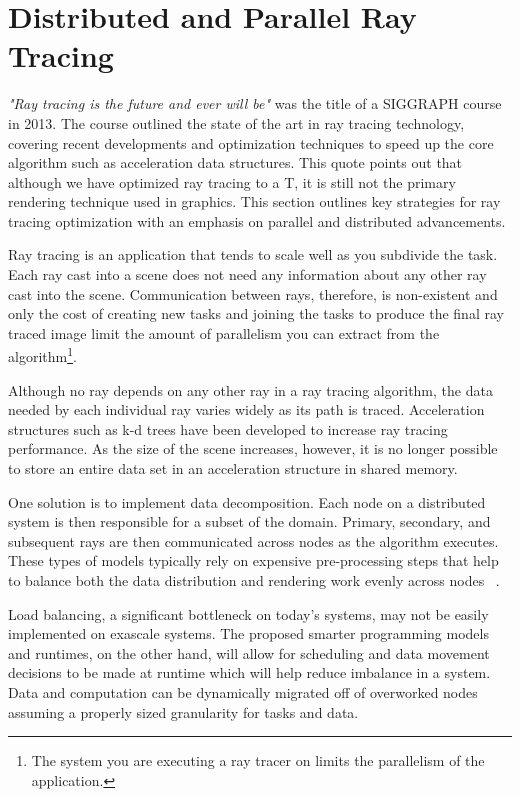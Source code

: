 \section{Distributed and Parallel Ray Tracing}
\label{sec:ray_tracing}

\emph{"Ray tracing is the future and ever will be"} was the title of a SIGGRAPH 
course in 2013.  The course outlined the state of the art in ray tracing 
technology, covering recent developments and optimization techniques to speed up 
the core algorithm such as acceleration data structures.  This quote points out 
that although we have optimized ray tracing to a T, it is still not the primary
rendering technique used in graphics.  This section outlines key strategies for 
ray tracing optimization with an emphasis on parallel and distributed 
advancements.

Ray tracing is an application that tends to scale well as you subdivide the 
task.  Each ray cast into a scene does not need any information about any other 
ray cast into the scene.  Communication between rays, therefore, is non-existent 
and only the cost of creating new tasks and joining the tasks to produce the 
final ray traced image limit the amount of parallelism you can extract from the
algorithm\footnote{ %
  The system you are executing a ray tracer on limits the parallelism of the 
  application.  
}.

Although no ray depends on any other ray in a ray tracing algorithm, the data 
needed by each individual ray varies widely as its path is traced. Acceleration 
structures such as k-d trees have been developed to increase ray tracing 
performance. As the size of the scene increases, however, it is no longer 
possible to store an entire data set in an acceleration structure in shared 
memory.

One solution is to implement data decomposition. Each node on a distributed 
system is then responsible for a subset of the domain. Primary, secondary, 
and subsequent rays are then communicated across nodes as the algorithm 
executes. These types of models typically rely on expensive pre-processing steps 
that help to balance both the data distribution and rendering work evenly across 
nodes ~\cite{navratil2014dynamic}.

Load balancing, a significant bottleneck on today's systems, may not be easily 
implemented on exascale systems. The proposed smarter programming models and 
runtimes, on the other hand, will allow for scheduling and data movement 
decisions to be made at runtime which will help reduce imbalance in a system. 
Data and computation can be dynamically migrated off of overworked nodes 
assuming a properly sized granularity for tasks and data.

